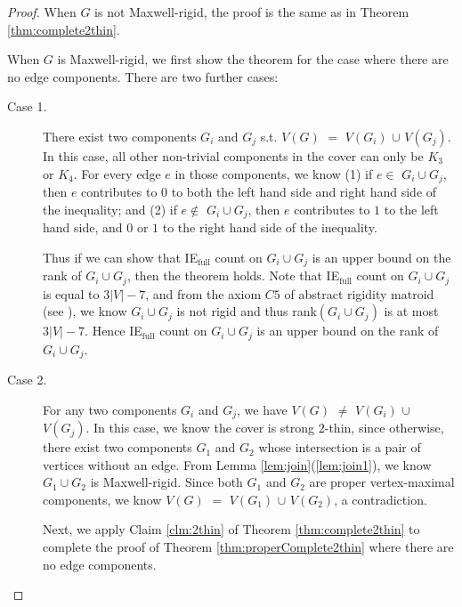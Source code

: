 \documentclass[10pt]{article}
\def\N{\mathcal {N}}
\def\H{\mathcal {H}}
\def\X{\mathcal {X}}
\begin{document}
\begin{proof}
When $G$ is not Maxwell-rigid, the proof is the same as in Theorem \ref{thm:complete2thin}.

When $G$ is Maxwell-rigid, we first show the theorem for the case where there are no edge components. There are two further cases:
\begin{description}

\item[Case 1.] There exist two components $G_i$ and $G_j$ s.t. $V(G)$ $=$ $V(G_i)$ $\cup$ $V(G_j)$. In this case, all other non-trivial components in the cover can only be $K_3$ or $K_4$. For every edge $e$ in those components, we know (1) if $e\in$ $G_i\cup G_j$, then $e$ contributes to $0$ to both the left hand side and right hand side of the inequality; and (2) if $e\not\in$ $G_i\cup G_j$,  then $e$ contributes to $1$ to the left hand side, and $0$ or $1$ to the right hand side of the inequality. 

Thus if we can show that IE$_\text{full}$ count on $G_i\cup G_j$ is an upper bound on the rank of $G_i\cup G_j$, then the theorem holds. Note that IE$_\text{full}$ count on $G_i\cup G_j$ is equal to $3|V|-7$, and from the axiom $C5$ of abstract rigidity matroid (see \cite{graver:servatius:rigidityBook:1993}), we know $G_i\cup G_j$ is not rigid and thus rank$(G_i\cup G_j)$ is at most $3|V|-7$. Hence IE$_\text{full}$ count on $G_i\cup G_j$ is an upper bound on the rank of $G_i\cup G_j$.


\item[Case 2.] For any two components $G_i$ and $G_j$, we have $V(G)$ $\neq$ $V(G_i)$ $\cup$ $V(G_j)$. In this case, we know the cover is strong $2$-thin, since otherwise, there exist two components $G_1$ and $G_2$ whose intersection is a pair of vertices without an edge. From Lemma \ref{lem:join}(\ref{lem:join1}), we know $G_1\cup G_2$ is Maxwell-rigid. Since both $G_1$ and $G_2$ are proper vertex-maximal components, we know $V(G)$ $=$ $V(G_1)$ $\cup$ $V(G_2)$, a contradiction.

Next, we apply Claim \ref{clm:2thin} of Theorem \ref{thm:complete2thin} to complete the proof of Theorem \ref{thm:properComplete2thin} where there are no edge components.

\begin{comment}
Next, we can 

follow the proof of Theorem \ref{thm:complete2thin}. First we can obtain that for every edge $e \in \H(\X)$, there is at most one $\N_i$ where $G_i$ contains $e$ s.t. $ \{e\} \cup E(\N_i)$ is Maxwell-dependent. Otherwise, if there is an edge $e \in \H(\X)$ s.t. (1) there are two components $G_i$ and $G_j$ containing $e$ and (2) $ \{e\} \cup E(\N_i)$ and $ \{e\} \cup E(\N_j)$ are both Maxwell-dependent, then from Lemma \ref{obs:maximal}(\ref{obs:maximal2}), we can see that $V(G_i)$ $\cup$ $V(G_j) =V(G)$, a contradiction.


\end{comment}
\end{description}
\end{proof}
\end{document}

